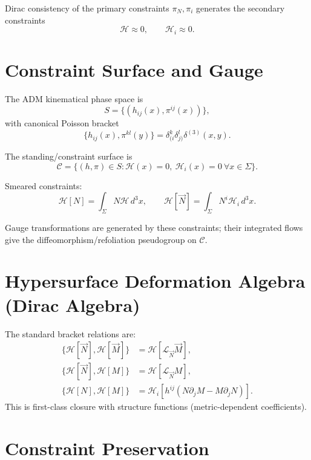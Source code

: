 \documentclass[11pt]{article}
\theoremstyle{remark}
\theoremstyle{plain}
\begin{document}
Dirac consistency of the primary constraints $\pi_N,\pi_i$ generates the secondary constraints
\begin{equation}
\mathcal{H}\approx 0,\qquad \mathcal{H}_i\approx 0.
\end{equation}

\section{Constraint Surface and Gauge}

The ADM kinematical phase space is
\begin{equation}
S=\{(h_{ij}(x),\pi^{ij}(x))\},
\end{equation}
with canonical Poisson bracket
\begin{equation}
\{h_{ij}(x),\pi^{kl}(y)\}=\delta_{(i}^k\delta_{j)}^l\delta^{(3)}(x,y).
\end{equation}

The standing/constraint surface is
\begin{equation}
\mathcal{C}=\{(h,\pi)\in S: \mathcal{H}(x)=0,\ \mathcal{H}_i(x)=0\ \forall x\in\Sigma\}.
\end{equation}

Smeared constraints:
\begin{equation}
\mathcal{H}[N]=\int_\Sigma N\mathcal{H}\,d^3x,\qquad
\mathcal{H}[\vec N]=\int_\Sigma N^i\mathcal{H}_i\,d^3x.
\end{equation}

Gauge transformations are generated by these constraints; their integrated flows give the diffeomorphism/refoliation pseudogroup on $\mathcal{C}$.

\section{Hypersurface Deformation Algebra (Dirac Algebra)}

The standard bracket relations are:
\begin{align}
\{\mathcal{H}[\vec N],\mathcal{H}[\vec M]\} &= \mathcal{H}[\mathcal{L}_{\vec N}\vec M],\\
\{\mathcal{H}[\vec N],\mathcal{H}[M]\} &= \mathcal{H}[\mathcal{L}_{\vec N}M],\\
\{\mathcal{H}[N],\mathcal{H}[M]\} &= \mathcal{H}_i[h^{ij}(N\partial_jM-M\partial_jN)].
\end{align}
This is first-class closure with structure functions (metric-dependent coefficients).

\section{Constraint Preservation}
\end{document}
